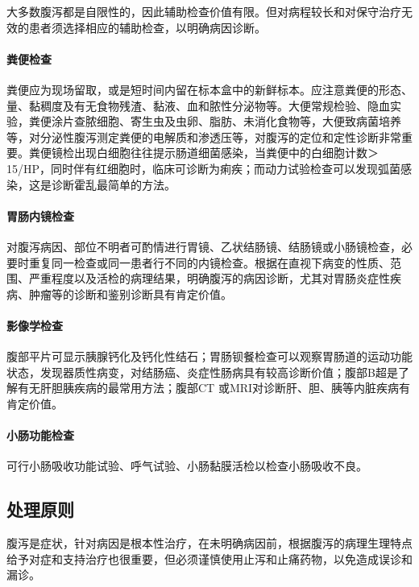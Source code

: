 大多数腹泻都是自限性的，因此辅助检查价值有限。但对病程较长和对保守治疗无效的患者须选择相应的辅助检查，以明确病因诊断。

\paragraph{粪便检查}

粪便应为现场留取，或是短时间内留在标本盒中的新鲜标本。应注意粪便的形态、量、黏稠度及有无食物残渣、黏液、血和脓性分泌物等。大便常规检验、隐血实验，粪便涂片查脓细胞、寄生虫及虫卵、脂肪、未消化食物等，大便致病菌培养等，对分泌性腹泻测定粪便的电解质和渗透压等，对腹泻的定位和定性诊断非常重要。粪便镜检出现白细胞往往提示肠道细菌感染，当粪便中的白细胞计数＞
15/HP，同时伴有红细胞时，临床可诊断为痢疾；而动力试验检查可以发现弧菌感染，这是诊断霍乱最简单的方法。

\paragraph{胃肠内镜检查}

对腹泻病因、部位不明者可酌情进行胃镜、乙状结肠镜、结肠镜或小肠镜检查，必要时重复同一检查或同一患者行不同的内镜检查。根据在直视下病变的性质、范围、严重程度以及活检的病理结果，明确腹泻的病因诊断，尤其对胃肠炎症性疾病、肿瘤等的诊断和鉴别诊断具有肯定价值。

\paragraph{影像学检查}

腹部平片可显示胰腺钙化及钙化性结石；胃肠钡餐检查可以观察胃肠道的运动功能状态，发现器质性病变，对结肠癌、炎症性肠病具有较高诊断价值；腹部B超是了解有无肝胆胰疾病的最常用方法；腹部CT
或MRI对诊断肝、胆、胰等内脏疾病有肯定价值。

\paragraph{小肠功能检查}

可行小肠吸收功能试验、呼气试验、小肠黏膜活检以检查小肠吸收不良。

\subsection{处理原则}

腹泻是症状，针对病因是根本性治疗，在未明确病因前，根据腹泻的病理生理特点给予对症和支持治疗也很重要，但必须谨慎使用止泻和止痛药物，以免造成误诊和漏诊。

